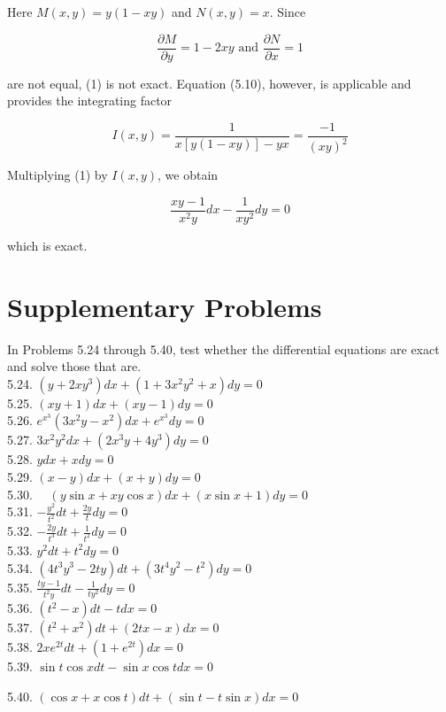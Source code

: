 \documentclass[10pt]{article}
\begin{document}
Here $M(x, y)=y(1-x y)$ and $N(x, y)=x$. Since

$$
\frac{\partial M}{\partial y}=1-2 x y \text { and } \frac{\partial N}{\partial x}=1
$$

are not equal, (1) is not exact. Equation (5.10), however, is applicable and provides the integrating factor

$$
I(x, y)=\frac{1}{x[y(1-x y)]-y x}=\frac{-1}{(x y)^{2}}
$$

Multiplying (1) by $I(x, y)$, we obtain

$$
\frac{x y-1}{x^{2} y} d x-\frac{1}{x y^{2}} d y=0
$$

which is exact.

\section*{Supplementary Problems}
In Problems 5.24 through 5.40, test whether the differential equations are exact and solve those that are.\\
5.24. $\left(y+2 x y^{3}\right) d x+\left(1+3 x^{2} y^{2}+x\right) d y=0$\\
5.25. $(x y+1) d x+(x y-1) d y=0$\\
5.26. $e^{x^{3}}\left(3 x^{2} y-x^{2}\right) d x+e^{x^{3}} d y=0$\\
5.27. $3 x^{2} y^{2} d x+\left(2 x^{3} y+4 y^{3}\right) d y=0$\\
5.28. $y d x+x d y=0$\\
5.29. $(x-y) d x+(x+y) d y=0$\\
5.30. $\quad(y \sin x+x y \cos x) d x+(x \sin x+1) d y=0$\\
5.31. $-\frac{y^{2}}{t^{2}} d t+\frac{2 y}{t} d y=0$\\
5.32. $-\frac{2 y}{t^{3}} d t+\frac{1}{t^{2}} d y=0$\\
5.33. $y^{2} d t+t^{2} d y=0$\\
5.34. $\left(4 t^{3} y^{3}-2 t y\right) d t+\left(3 t^{4} y^{2}-t^{2}\right) d y=0$\\
5.35. $\frac{t y-1}{t^{2} y} d t-\frac{1}{t y^{2}} d y=0$\\
5.36. $\left(t^{2}-x\right) d t-t d x=0$\\
5.37. $\left(t^{2}+x^{2}\right) d t+(2 t x-x) d x=0$\\
5.38. $2 x e^{2 t} d t+\left(1+e^{2 t}\right) d x=0$\\
5.39. $\sin t \cos x d t-\sin x \cos t d x=0$

5.40. $(\cos x+x \cos t) d t+(\sin t-t \sin x) d x=0$
\end{document}
